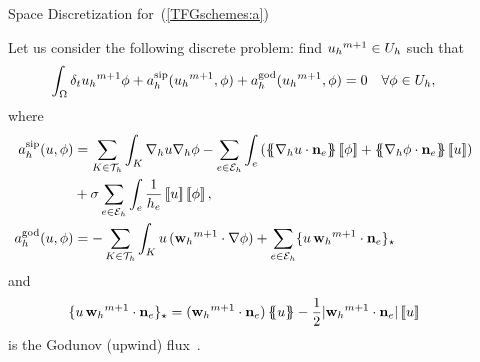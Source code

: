 \documentclass[final]{beamer}
\renewcommand{\indent}{\hspace*{2em}}
\newlength{\sepwid}
\newlength{\onecolwid}
\begin{document}
\begin{frame}[t]
\begin{columns}[t]
\begin{column}{\onecolwid}
\begin{block}{Space Discretization for~(\ref{TFGschemes:a})}
        \bigskip\par\indent Let us consider the following discrete problem: find
        ${{u_{h}}^{m+1}}\in U_h$ such that
        \begin{equation}
          \label{discrete_problem_u}
          \int_\Omega \delta_t{{u_{h}}^{m+1}} \phi + a_h^{\mathrm{sip}}({{u_{h}}^{m+1}},\phi) + a_h^{\mathrm{god}}({{u_{h}}^{m+1}},\phi)=0 \quad \forall\phi\in U_h,
        \end{equation}
        where
        \begin{align*}
          \asip(u,\phi) &= \sum_{K\in\mathcal{T}_h}\int_K\nabla_h u\nabla_h \phi-\sum_{e\in\mathcal{E}_h}\int_e\left(\average{\nabla_h u\cdot\mathbf{n}_e}\jump{\phi}+\average{\nabla_h \phi\cdot\mathbf{n}_e}\jump{u}\right)\\&+\sigma\sum_{e\in\mathcal{E}_h}\int_e\frac{1}{h_e}\jump{u}\jump{\phi},
          \\
          \agod(u,\phi) &= -\sum_{K \in\mathcal{T}_h} \int_K u \, (\wwmm\cdot \grad\phi)
                          + \sum_{e\in\Eh}\{ u \, \wwmm \cdot \nn_e\}_\star
        \end{align*}
        and
        $$
        \{ u \, {{\mathbf{w}_{h}}^{m+1}} \cdot \mathbf{n}_e\}_\star=({{\mathbf{w}_{h}}^{m+1}}\cdot \mathbf{n}_e)\left\{\!\!\left\{u\right\}\!\!\right\} -\frac{1}{2}|{{\mathbf{w}_{h}}^{m+1}}\cdot\mathbf{n}_e|\left[\!\left[u\right]\!\right]
        $$
        is the Godunov (upwind) flux~\cite{anderson_high-order_2017}.

      \end{block}

    \end{column}



    \begin{column}{\sepwid}  \end{column}

    \vspace*{0.5cm}


\end{columns}
\end{frame}
\end{document}
